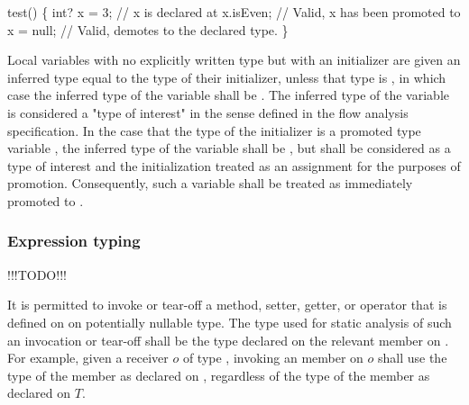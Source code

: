 \documentclass[makeidx]{article}
\begin{document}
{

\begin{dartCode}
\VOID test() \{
  int? x = 3; // x is declared at 
  x.isEven; // Valid, x has been promoted to 
  x = null; // Valid, demotes to the declared type.
\}
\end{dartCode}

Local variables with no explicitly written type but with an initializer are
given an inferred type equal to the type of their initializer, unless that type
is , in which case the inferred type of the variable shall be \DYNAMIC.
The inferred type of the variable is considered a "type of interest" in the
sense defined in the flow analysis specification.  In the case that the type of
the initializer is a promoted type variable , the inferred type of the
variable shall be , but  shall be considered as a type of interest and
the initialization treated as an assignment for the purposes of promotion.
Consequently, such a variable shall be treated as immediately promoted to .

\subsubsection{Expression typing}

!!!TODO!!!

It is permitted to invoke or tear-off a method, setter, getter, or operator that
is defined on  on potentially nullable type.  The type used for static
analysis of such an invocation or tear-off shall be the type declared on the
relevant member on .  For example, given a receiver $o$ of type ,
invoking an  member on $o$ shall use the type of the member as declared
on , regardless of the type of the member as declared on $T$.


}
\end{document}

